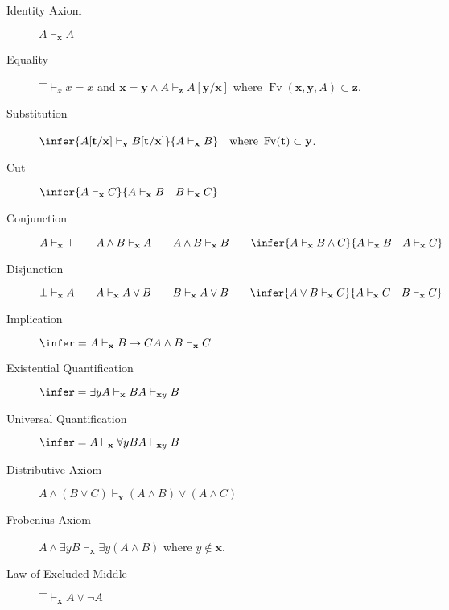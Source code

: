 \documentclass[UTF8,aspectratio=43,11pt,colorlinks,compress,openany]{beamer}%
\begin{document}
\begin{frame}\frametitle{}
\begin{description}
	\item[Identity Axiom] $A\vdash_{\mathbf{x}}A$
	\item[Equality] $\top\vdash_x x=x$\;\; and\;\; $\mathbf{x}=\mathbf{y}\wedge A\vdash_{\mathbf{z}}A[\mathbf{y}/\mathbf{x}]$ where $\operatorname{Fv}(\mathbf{x},\mathbf{y},A)\subset\mathbf{z}$.
	\item[Substitution] $\infer{A[\mathbf{t}/\mathbf{x}]\vdash_{\mathbf{y}}B[\mathbf{t}/\mathbf{x}]}{A\vdash_{\mathbf{x}}B}\quad\mbox{where } \operatorname{Fv}(\mathbf{t})\subset\mathbf{y}$.
	\item[Cut] $\infer{A\vdash_{\mathbf{x}}C}{A\vdash_{\mathbf{x}}B\quad B\vdash_{\mathbf{x}}C}$
	\item[Conjunction] $A\vdash_{\mathbf{x}}\top\qquad A\wedge B\vdash_{\mathbf{x}}A\qquad A\wedge B\vdash_{\mathbf{x}}B\qquad\infer{A\vdash_{\mathbf{x}}B\wedge C}{A\vdash_{\mathbf{x}}B\quad A\vdash_{\mathbf{x}}C}$
	\item[Disjunction] $\bot\vdash_{\mathbf{x}}A\qquad A\vdash_{\mathbf{x}}A\vee B\qquad B\vdash_{\mathbf{x}}A\vee B\qquad\infer{A\vee B\vdash_{\mathbf{x}} C}{A\vdash_{\mathbf{x}} C\quad B\vdash_{\mathbf{x}} C}$
	\item[Implication] $\infer={A\vdash_{\mathbf{x}}B\to C}{A\wedge B\vdash_{\mathbf{x}}C}$
	\item[Existential Quantification] $\infer={\exists yA\vdash_{\mathbf{x}}B}{A\vdash_{\mathbf{x}y}B}$
	\item[Universal Quantification] $\infer={A\vdash_{\mathbf{x}}\forall yB}{A\vdash_{\mathbf{x}y}B}$
	\item[Distributive Axiom] $A\wedge(B\vee C)\vdash_{\mathbf{x}}(A\wedge B)\vee(A\wedge C)$
	\item[Frobenius Axiom] $A\wedge\exists yB\vdash_{\mathbf{x}} \exists y(A\wedge B)$ where $y\notin\mathbf{x}$.
	\item[Law of Excluded Middle] $\top\vdash_{\mathbf{x}}A\vee\neg A$
\end{description}
\end{frame}
\end{document}
